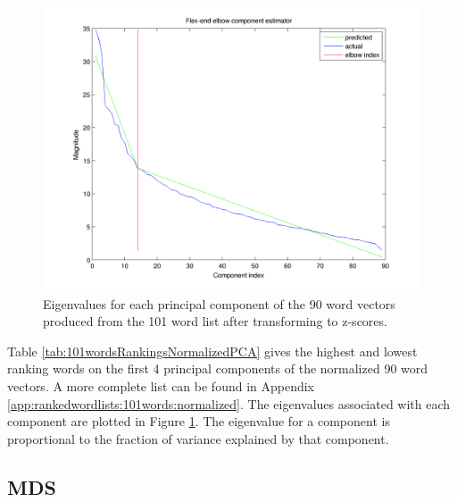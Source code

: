\documentclass[10pt,letterpaper]{book}
\begin{document}


\begin{figure}[!htbp]
    \includegraphics[width=0.9\linewidth]{100words-adj-800dim-lowercase_wmt_model-zscore_transformed-flex_end_elbow}
    \caption{Eigenvalues for each principal component of the 90 word vectors
    produced from the 101 word list after transforming to z-scores.}
    \label{fig:101wordsnormalizedpcaeigenvalues}
\end{figure}

Table \ref{tab:101wordsRankingsNormalizedPCA} gives the highest and lowest
ranking words on the first 4 principal components of the normalized 90 word 
vectors. A more complete list can be found in Appendix 
\ref{app:rankedwordlists:101words:normalized}. The eigenvalues associated 
with each component are plotted in Figure 
\ref{fig:101wordsnormalizedpcaeigenvalues}. The eigenvalue for a component is
proportional to the fraction of variance explained by that component.


\subsection{MDS}


\end{document}
